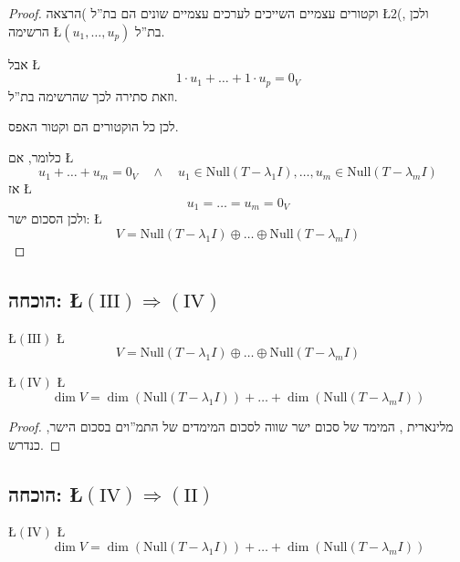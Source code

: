 \documentclass[english,hebrew]{article}
\begin{document}
\begin{proof}
וקטורים עצמיים השייכים לערכים עצמיים שונים הם בת\textquotedblright ל
)הרצאה \L{$2$}(, ולכן הרשימה \L{$(u_{1},\dots,u_{p})$} בת\textquotedblright ל.

אבל \L{%
\[
1\cdot u_{1}+\dots+1\cdot u_{p}=0_{V}
\]
}%
וזאת סתירה לכך שהרשימה בת\textquotedblright ל.

לכן כל הוקטורים הם וקטור האפס.

כלומר, אם \L{%
\[
u_{1}+\dots+u_{m}=0_{V}\quad\wedge\quad u_{1}\in\text{Null}(T-\lambda_{1}I),\dots,u_{m}\in\text{Null}(T-\lambda_{m}I)
\]
}%
אז \L{%
\[
u_{1}=\dots=u_{m}=0_{V}
\]
}%
ולכן הסכום ישר: \L{%
\[
V=\text{Null}(T-\lambda_{1}I)\oplus\dots\oplus\text{Null}(T-\lambda_{m}I)
\]
}%
\end{proof}

\subsection{הוכחה: \L{$(\text{III})\Rightarrow(\text{IV})$}}

\L{$(\text{III})$} \L{%
\[
V=\text{Null}(T-\lambda_{1}I)\oplus\dots\oplus\text{Null}(T-\lambda_{m}I)
\]
}%

\L{$(\text{IV})$} \L{%
\[
\dim V=\dim\left(\text{Null}(T-\lambda_{1}I)\right)+\dots+\dim\left(\text{Null}(T-\lambda_{m}I)\right)
\]
}%

\begin{proof}
מלינארית {\endL}, המימד של סכום ישר שווה לסכום המימדים של
התמ\textquotedblright וים בסכום הישר, כנדרש.
\end{proof}

\subsection{הוכחה: \L{$(\text{IV})\Rightarrow(\text{II})$}}

\L{$(\text{IV})$} \L{%
\[
\dim V=\dim\left(\text{Null}(T-\lambda_{1}I)\right)+\dots+\dim\left(\text{Null}(T-\lambda_{m}I)\right)
\]
}%
\end{document}
